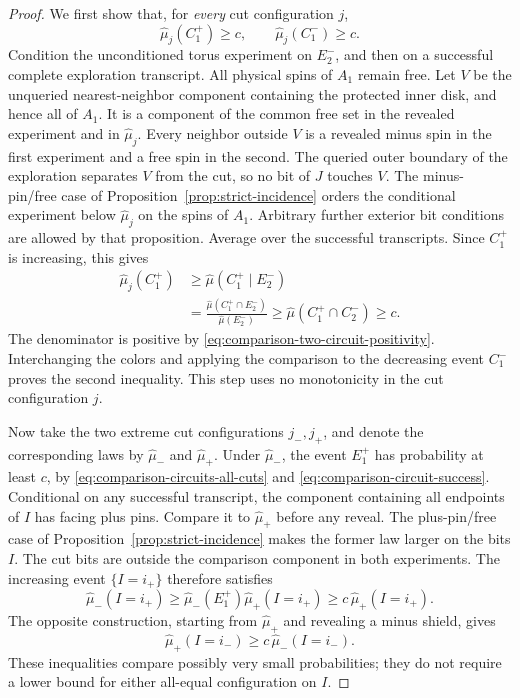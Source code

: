 \begin{proof}
We first show that, for \emph{every} cut configuration \(j\),
\begin{equation}
 \widehat\mu_j(C_1^+)\ge c,\qquad
 \widehat\mu_j(C_1^-)\ge c.
 \label{eq:comparison-circuits-all-cuts}
\end{equation}
Condition the unconditioned torus experiment on \(E_2^-\), and then on
a successful complete exploration transcript.  All physical spins of
\(A_1\) remain free.  Let \(V\) be the unqueried nearest-neighbor
component containing the protected inner disk, and hence all of \(A_1\).
It is a component of the common free set in the revealed experiment
and in \(\widehat\mu_j\).  Every neighbor outside \(V\) is a revealed
minus spin in the first experiment and a free spin in the second.
The queried outer boundary of the exploration separates \(V\) from
the cut, so no bit of \(J\) touches \(V\).  The minus-pin/free case of Proposition~\ref{prop:strict-incidence} orders
the conditional experiment below \(\widehat\mu_j\) on the spins of
\(A_1\).  Arbitrary further exterior bit conditions are allowed by that
proposition.  Average over the successful transcripts.  Since
\(C_1^+\) is increasing, this gives
\begin{align*}
 \widehat\mu_j(C_1^+)
 &\ge \widehat\mu(C_1^+\mid E_2^-)\\
 &=\frac{\widehat\mu(C_1^+\cap E_2^-)}
          {\widehat\mu(E_2^-)}
 \ge \widehat\mu(C_1^+\cap C_2^-)\ge c.
\end{align*}
The denominator is positive by
\eqref{eq:comparison-two-circuit-positivity}.  Interchanging the colors
and applying the comparison to the decreasing event \(C_1^-\) proves
the second inequality.  This step uses no monotonicity in the cut
configuration \(j\).

Now take the two extreme cut configurations \(j_-,j_+\), and denote the
corresponding laws by \(\widehat\mu_-\) and \(\widehat\mu_+\).
Under \(\widehat\mu_-\), the event \(E_1^+\) has probability at least
\(c\), by \eqref{eq:comparison-circuits-all-cuts} and
\eqref{eq:comparison-circuit-success}.  Conditional on any successful
transcript, the component containing all endpoints of \(I\) has facing
plus pins.  Compare it to \(\widehat\mu_+\) before any reveal.  The
plus-pin/free case of Proposition~\ref{prop:strict-incidence} makes
the former law larger on the bits \(I\).  The cut bits are outside the
comparison component in both experiments.  The increasing event
\(\{I=i_+\}\) therefore satisfies
\begin{equation}
 \widehat\mu_-(I=i_+)\ge
 \widehat\mu_-(E_1^+)\widehat\mu_+(I=i_+)
 \ge c\,\widehat\mu_+(I=i_+).
 \label{eq:comparison-plus-extreme}
\end{equation}
The opposite construction, starting from \(\widehat\mu_+\) and
revealing a minus shield, gives
\begin{equation}
 \widehat\mu_+(I=i_-)\ge
 c\,\widehat\mu_-(I=i_-).
 \label{eq:comparison-minus-extreme}
\end{equation}
These inequalities compare possibly very small probabilities; they do
not require a lower bound for either all-equal configuration on \(I\).


\end{proof}
